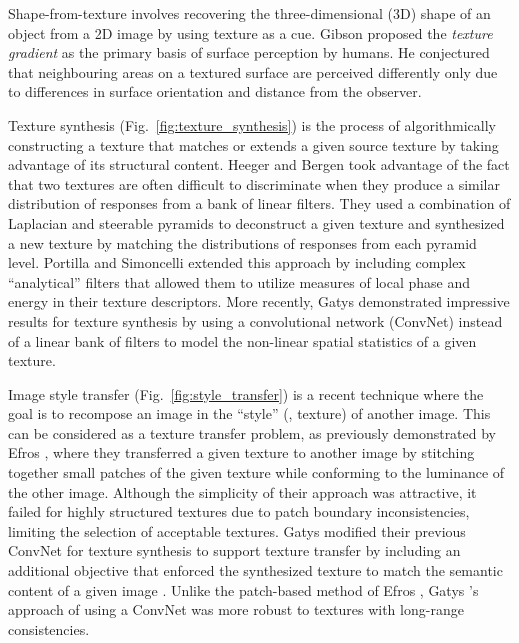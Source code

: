 Shape-from-texture involves recovering the
three-dimensional (3D) shape of an object from a 2D image by using texture as a 
cue. Gibson \cite{gibson1950perception} proposed the \emph{texture gradient} as 
the primary basis of surface perception by humans. He conjectured that neighbouring areas on a textured surface are perceived differently only due to differences
in surface orientation and distance from the observer.



Texture synthesis (Fig.\ \ref{fig:texture_synthesis}) is the process of algorithmically constructing a texture that
matches or extends a given source texture by taking advantage of its structural 
content. Heeger and Bergen \cite{heeger1995pyramid} took advantage of the fact 
that two textures are often difficult to discriminate when they produce a similar 
distribution of responses from a bank of linear filters. They used a combination 
of Laplacian and steerable pyramids to deconstruct a given texture and 
synthesized a new texture by matching the distributions of responses from each
pyramid level. Portilla and Simoncelli \cite{portilla2000parametric} extended this approach by including complex ``analytical'' filters that allowed them to utilize measures of local phase and energy in their texture descriptors. More recently, Gatys \etal \cite{gatys2015} demonstrated 
impressive results for texture synthesis by using a convolutional network (ConvNet) instead of a linear 
bank of filters to model the non-linear spatial statistics of a given texture.



Image style transfer (Fig.\ \ref{fig:style_transfer}) is a recent technique where the goal is to 
recompose an image in the ``style'' (\eg, texture) of another image. This can be considered as a 
texture transfer problem, as previously demonstrated by Efros \etal \cite{efros2001image}, where they transferred a given texture to another image by stitching together small patches of the given texture while conforming to the luminance of the other image. Although the simplicity of their approach was attractive, it failed for highly structured textures due to patch boundary inconsistencies, limiting the selection of acceptable textures. 
Gatys \etal modified their previous ConvNet for texture synthesis \cite{gatys2015} to support texture transfer by including an additional objective that enforced the synthesized texture to match the semantic content of a given image \cite{gatys2016image}. Unlike the patch-based method of Efros \etal \cite{efros2001image}, Gatys \etal's approach of using a ConvNet was more robust to textures with long-range consistencies.

